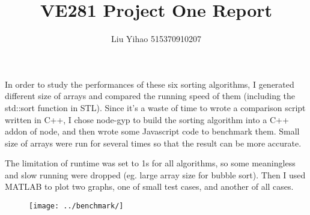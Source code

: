 \documentclass{article}
\title{VE281 Project One Report}
\author{Liu Yihao 515370910207}
\date{}
\begin{document}
\maketitle

In order to study the performances of these six sorting algorithms, I generated different size of arrays and compared the running speed of them (including the std::sort function in STL). Since it's a waste of time to wrote a comparison script written in C++, I chose node-gyp to build the sorting algorithm into a C++ addon of node, and then wrote some Javascript code to benchmark them. Small size of arrays were run for several times so that the result can be more accurate.

The limitation of runtime was set to 1s for all algorithms, so some meaningless and slow running were dropped (eg. large array size for bubble sort). Then I used MATLAB to plot two graphs, one of small test cases, and another of all cases.

\begin{figure}
\texttt{[image: ../benchmark/]}
\end{figure}

 
\end{document}
